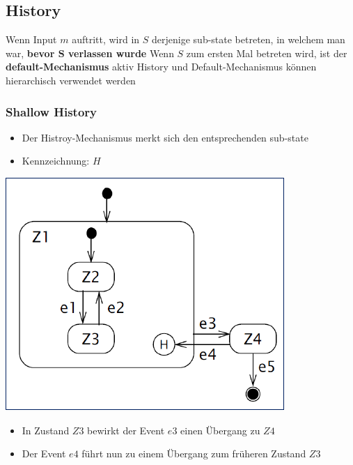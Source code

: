 \subsection{History}

\begin{outline}
    \1 Wenn Input $m$ auftritt, wird in $S$ derjenige sub-state betreten, in welchem man war, \textbf{bevor $\bm{S}$ verlassen wurde}
        \2 Wenn $S$ zum ersten Mal betreten wird, ist der \textbf{default-Mechanismus} aktiv
    \1 History und Default-Mechanismus können hierarchisch verwendet werden
\end{outline}


\subsubsection{Shallow History}

\begin{itemize}
    \item Der Histroy-Mechanismus merkt sich den entsprechenden sub-state
    \item Kennzeichnung: $H$
\end{itemize}



\begin{minipage}[c]{0.48\columnwidth}
    \includegraphics[width=\columnwidth]{images/statechart_shallow_history.pdf}
\end{minipage}
\hfill
\begin{minipage}[c]{0.48\columnwidth}
    \begin{itemize}
        \item In Zustand $Z3$ bewirkt der Event $e3$ einen Übergang zu $Z4$
        \item Der Event $e4$ führt nun zu einem Übergang zum früheren Zustand $Z3$
    \end{itemize}
\end{minipage}


